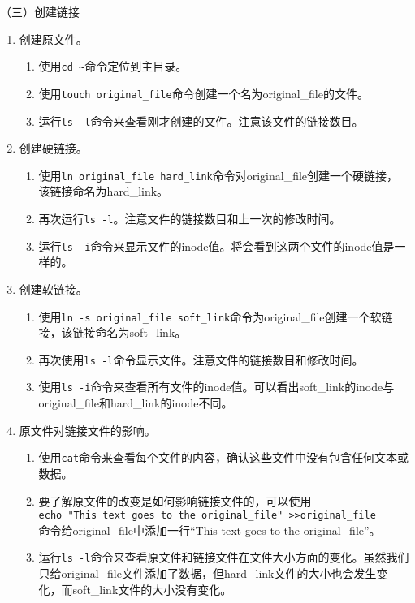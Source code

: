 \vspace{0.1in}
（三）创建链接
\begin{enumerate}
  \item 创建原文件。
    \begin{enumerate}
      \item 使用\verb|cd ~|命令定位到主目录。
      \item 使用\verb|touch original_file|命令创建一个名为original\_file的文件。
      \item 运行\verb|ls -l|命令来查看刚才创建的文件。注意该文件的链接数目。
    \end{enumerate}
  \item 创建硬链接。
    \begin{enumerate}
      \item 使用\verb|ln original_file hard_link|命令对original\_file创建一个硬链接，该链接命名为hard\_link。
      \item 再次运行\verb|ls -l|。注意文件的链接数目和上一次的修改时间。
      \item 运行\verb|ls -i|命令来显示文件的inode值。将会看到这两个文件的inode值是一样的。
    \end{enumerate}
  \item 创建软链接。
    \begin{enumerate}
      \item 使用\verb|ln -s original_file soft_link|命令为original\_file创建一个软链接，该链接命名为soft\_link。
      \item 再次使用\verb|ls -l|命令显示文件。注意文件的链接数目和修改时间。
      \item 使用\verb|ls -i|命令来查看所有文件的inode值。可以看出soft\_link的inode与original\_file和hard\_link的inode不同。
    \end{enumerate}
  \item 原文件对链接文件的影响。
    \begin{enumerate}
      \item 使用\verb|cat|命令来查看每个文件的内容，确认这些文件中没有包含任何文本或数据。
      \item 要了解原文件的改变是如何影响链接文件的，可以使用\\ \verb|echo "This text goes to the original_file" >>original_file| \\ 命令给original\_file中添加一行“This text goes to the original\_file”。
      \item 运行\verb|ls -l|命令来查看原文件和链接文件在文件大小方面的变化。虽然我们只给original\_file文件添加了数据，但hard\_link文件的大小也会发生变化，而soft\_link文件的大小没有变化。

\end{enumerate}
\end{enumerate}
